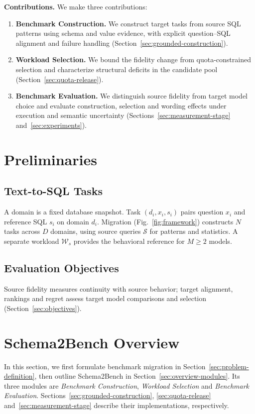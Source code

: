 \textbf{Contributions.} We make three contributions:
\begin{enumerate}
\item \textbf{Benchmark Construction.} We construct target tasks from source SQL patterns using schema and value evidence, with explicit question--SQL alignment and failure handling (Section~\ref{sec:grounded-construction}).
\item \textbf{Workload Selection.} We bound the fidelity change from quota-constrained selection and characterize structural deficits in the candidate pool (Section~\ref{sec:quota-release}).
\item \textbf{Benchmark Evaluation.} We distinguish source fidelity from target model choice and evaluate construction, selection and wording effects under execution and semantic uncertainty (Sections~\ref{sec:measurement-stage} and~\ref{sec:experiments}).
\end{enumerate}

\section{Preliminaries}\label{sec:preliminaries}
\subsection{Text-to-SQL Tasks}
A domain is a fixed database snapshot. Task $(d_i,x_i,s_i)$ pairs question $x_i$ and reference SQL $s_i$ on domain $d_i$. Migration (Fig.~\ref{fig:framework}) constructs $N$ tasks across $D$ domains, using source queries $\mathcal S$ for patterns and statistics. A separate workload $\mathcal W_s$ provides the behavioral reference for $M\ge2$ models.

\subsection{Evaluation Objectives}
Source fidelity measures continuity with source behavior; target alignment, rankings and regret assess target model comparisons and selection (Section~\ref{sec:objectives}).

\section{Schema2Bench Overview}\label{sec:framework}
In this section, we first formulate benchmark migration in Section~\ref{sec:problem-definition}, then outline Schema2Bench in Section~\ref{sec:overview-modules}. Its three modules are \emph{Benchmark Construction}, \emph{Workload Selection} and \emph{Benchmark Evaluation}. Sections~\ref{sec:grounded-construction}, \ref{sec:quota-release} and~\ref{sec:measurement-stage} describe their implementations, respectively.

